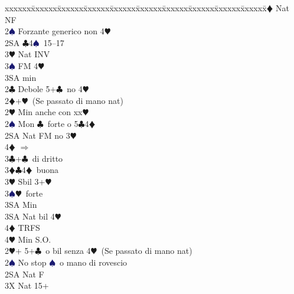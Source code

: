 \documentclass[a4paper,italian]{article}
\newcommand{\BC}{\textcolor{OliveGreen}{$\clubsuit$}}
\newcommand{\BD}{\textcolor{RedOrange}{$\vardiamondsuit$}}
\newcommand{\BH}{\textcolor{Red2}{$\varheartsuit${}}}
\newcommand{\BS}{\textcolor{MidnightBlue}{$\spadesuit${}}}
\newenvironment{bidtable}
{\begin{tabbing}

    xxxxxx\=xxxxxx\=xxxxxx\=xxxxxx\=xxxxxx\=xxxxxx\=xxxxxx\=xxxxxx\=xxxxxx\=xxxxxx\=\kill}
{\end{tabbing} }%
\begin{document}
\begin{multicols}{2}
\begin{bidtable}
                                            2\BD \> Nat NF\\
                                            2\BS \> Forzante generico non 4\BH \\
                                            2SA \BC 4\BS\ 15--17\\
                                            3\BH \> Nat INV\\
                                            3\BS \> FM 4\BH \+\\
                                            3SA \> min\-\-\\
                                            2\BC \> Debole 5+\BC\ no 4\BH \\
                                            2\BD {}+\BH\ (Se passato di mano nat)\+\\
                                            2\BH \> Min anche con xx\BH \\
                                            2\BS \> Mon \BC\ forte o 5\BC 4\BD \\
                                            2SA \> Nat FM no 3\BH \+\\
                                            4\BD \> $\Rightarrow$\-\\
                                            3\BC {}+\BC\ di dritto\\
                                            3\BD {}\BC 4\BD\ buona\\
                                            3\BH \> Sbil 3+\BH \\
                                            3\BS {}\BH\ forte\+\\
                                            3SA \> Min\-\\
                                            3SA \> Nat bil 4\BH \+\\
                                            4\BD \> TRFS\-\\
                                            4\BH \> Min S.O.\-\\
                                            2\BH {}+ 5+\BC\ o bil senza 4\BH\ (Se passato di mano nat)\+\\
                                            2\BS \> No stop \BS\ o mano di rovescio\+\\
                                            2SA \> Nat F\+\\
                                            3X \> Nat 15+\\

\end{bidtable}
\end{multicols}
\end{document}
